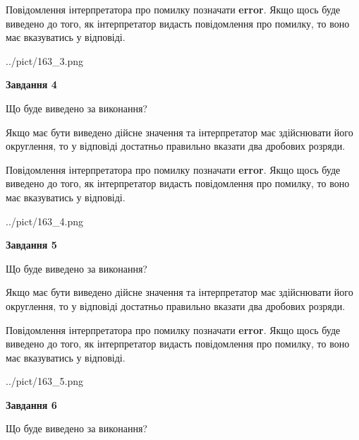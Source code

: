 \documentclass[12pt, ukrainian]{article}
\begin{document}
{\begin {Large}
Повідомлення інтерпретатора про помилку позначати \textbf{error}.
Якщо щось буде виведено до того, як інтерпретатор видасть повідомлення про помилку, 
то воно має вказуватись у відповіді. \par

\begin{center}
	{../pict/163_3.png}
\end{center}
\newpage

{\begin {center}\textbf{Завдання 4}\end {center}}\par
Що буде виведено за виконання? \par

Якщо має бути виведено дійсне значення та інтерпретатор має здійснювати його округлення, 
то у відповіді достатньо правильно вказати два дробових розряди.

Повідомлення інтерпретатора про помилку позначати \textbf{error}.
Якщо щось буде виведено до того, як інтерпретатор видасть повідомлення про помилку, 
то воно має вказуватись у відповіді. \par

\begin{center}
	{../pict/163_4.png}
\end{center}
\newpage

{\begin {center}\textbf{Завдання 5}\end {center}}\par
Що буде виведено за виконання? \par

Якщо має бути виведено дійсне значення та інтерпретатор має здійснювати його округлення, 
то у відповіді достатньо правильно вказати два дробових розряди.

Повідомлення інтерпретатора про помилку позначати \textbf{error}.
Якщо щось буде виведено до того, як інтерпретатор видасть повідомлення про помилку, 
то воно має вказуватись у відповіді. \par

\begin{center}
	{../pict/163_5.png}
\end{center}
\newpage

{\begin {center}\textbf{Завдання 6}\end {center}}\par
Що буде виведено за виконання? \par


\end{Large}}
\end{document}
